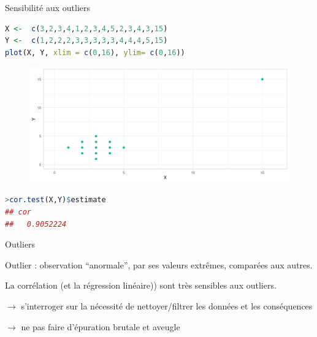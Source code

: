 \documentclass{beamer}
\begin{document}
\begin{frame}[fragile]{Sensibilité aux outliers}



\begin{tiny}
\begin{spacing}{0.75}
\begin{lstlisting}[language=R,basicstyle=\scriptsize\ttfamily, commentstyle=\ttfamily]
X <-  c(3,2,3,4,1,2,3,4,5,2,3,4,3,15)
Y <-  c(1,2,2,2,3,3,3,3,3,4,4,4,5,15)
plot(X, Y, xlim = c(0,16), ylim= c(0,16))
\end{lstlisting}
\end{spacing}
\end{tiny}




\begin{figure}
\includegraphics[width=.9\linewidth]{img/outlier2.png}
\end{figure}



\begin{tiny}
\begin{spacing}{0.75}
\begin{lstlisting}[language=R,basicstyle=\scriptsize\ttfamily, commentstyle=\ttfamily]
>cor.test(X,Y)$estimate
## cor 
##   0.9052224
\end{lstlisting}
\end{spacing}
\end{tiny}

\end{frame}



\begin{frame}{Outliers}


\alert{Outlier} : observation “anormale”, par ses valeurs extrêmes, comparées aux autres.

La corrélation (et la régression linéaire)) sont très sensibles aux outliers.

$\rightarrow$ s’interroger sur la nécessité de nettoyer/filtrer les données et les conséquences

$\rightarrow$ ne pas faire d’épuration brutale et aveugle

\end{frame}
\end{document}

